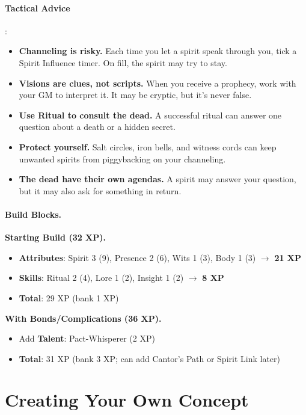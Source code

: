 \paragraph{Tactical Advice}:
\begin{itemize}
\item \textbf{Channeling is risky.} Each time you let a spirit speak through you, tick a Spirit Influence timer. On fill, the spirit may try to stay.
\item \textbf{Visions are clues, not scripts.} When you receive a prophecy, work with your GM to interpret it. It may be cryptic, but it's never false.
\item \textbf{Use Ritual to consult the dead.} A successful ritual can answer one question about a death or a hidden secret.
\item \textbf{Protect yourself.} Salt circles, iron bells, and witness cords can keep unwanted spirits from piggybacking on your channeling.
\item \textbf{The dead have their own agendas.} A spirit may answer your question, but it may also ask for something in return.
\end{itemize}

\paragraph{Build Blocks.}
\textbf{Starting Build (32 XP).}
\begin{itemize}
\item \textbf{Attributes}: Spirit 3 (9), Presence 2 (6), Wits 1 (3), Body 1 (3) \(\rightarrow\) \textbf{21 XP}
\item \textbf{Skills}: Ritual 2 (4), Lore 1 (2), Insight 1 (2) \(\rightarrow\) \textbf{8 XP}
\item \textbf{Total}: 29 XP (bank 1 XP)
\end{itemize}
\textbf{With Bonds/Complications (36 XP).}
\begin{itemize}
\item Add \textbf{Talent}: Pact-Whisperer (2 XP)
\item \textbf{Total}: 31 XP (bank 3 XP; can add Cantor's Path or Spirit Link later)
\end{itemize}

\section{Creating Your Own Concept}
\label{sec:creating-own-concept}

